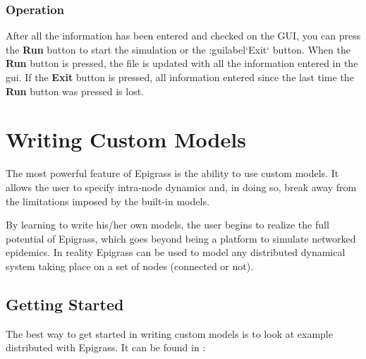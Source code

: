 \documentclass[a4paper,10pt]{manual}
\begin{document}
\subsection{Operation}

After all the information has been entered and checked on the GUI, you can press the \textbf{Run} button to start the simulation or the :guilabel`Exit` button. When the \textbf{Run} button is pressed, the  file is updated with all the information entered in the gui. If the \textbf{Exit} button is pressed, all information entered since the last time the \textbf{Run} button was pressed is lost.

\resetcurrentobjects

\resetcurrentobjects


\hypertarget{custom}{}\chapter{Writing Custom Models}
The most powerful feature of Epigrass is the ability to use custom
models. It allows the user to specify intra-node dynamics and, in
doing so, break away from the limitations imposed by the built-in
models.

By learning to write his/her own models, the user begins to realize
the full potential of Epigrass, which goes beyond being a platform to
simulate networked epidemics. In reality Epigrass can be used to model
any distributed dynamical system taking place on a set of nodes
(connected or not).


\section{Getting Started}

The best way to get started in writing custom models is to look at
example distributed with Epigrass. It can be found in
:
\end{document}
